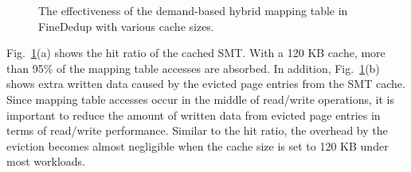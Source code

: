 \begin{figure}[t]
	\center
	\caption{The effectiveness of the demand-based hybrid mapping table in FineDedup with various cache sizes.}
	\label{fig:mappingoverhead}
\end{figure}

Fig.~\ref{fig:mappingoverhead}(a) shows the hit ratio of the cached SMT. 
With a 120 KB cache, more than 95\% of the mapping table accesses are absorbed.
In addition, Fig.~\ref{fig:mappingoverhead}(b) shows extra written data caused by the evicted page entries 
from the SMT cache.
Since mapping table accesses occur in the middle of read/write operations, it is important to reduce the 
amount of written data from evicted page entries in terms of read/write performance.
Similar to the hit ratio, the overhead by the eviction becomes almost negligible 
when the cache size is set to 120 KB under most workloads.

